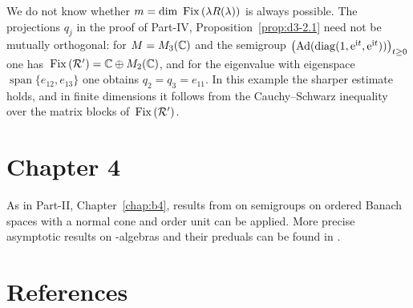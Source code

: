 \begin{enumerate}
We do not know whether $m = \mathop{}\!\mathrm{dim}\, \mathop{}\mathrm{Fix}\left(\lambda R(\lambda)\right)$ is always possible.
The projections $q_{j}$ in the proof of Part-IV, Proposition~\ref{prop:d3-2.1} need not be mutually orthogonal: for $M = M_{3}(\mathbb{C})$ and the semigroup $\bigl(\mathrm{Ad}(\mathrm{diag}(1, \eu^{\im t}, \eu^{\im t}))\bigr)_{t \geq 0}$ one has $\mathop{}\mathrm{Fix}\left(\mathcal{R}'\right) = \mathbb{C} \oplus M_{2}(\mathbb{C})$, and for the eigenvalue with eigenspace $\operatorname{span}\{e_{12}, e_{13}\}$ one obtains $q_{2} = q_{3} = e_{11}$.
In this example the sharper estimate holds, and in finite dimensions it follows from the Cauchy--Schwarz inequality over the matrix blocks of\/ $\mathop{}\mathrm{Fix}\left(\mathcal{R}'\right)$.

\end{enumerate}
\section*{Chapter 4}
As in Part-II, Chapter~\ref{chap:b4},  results from \textcite{zbmath07964911} on semigroups on ordered Banach spaces with a normal cone and order unit can be applied. 
More precise asymptotic results on \WA-algebras and their preduals can be found in \textcite{zbmath02244715}.
\section*{References}
{\RaggedRight
  \printbibliography[heading=none]
 }